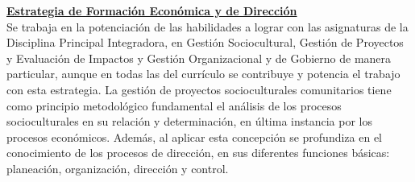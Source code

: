 \underline{\textbf{Estrategia de Formación Económica y de Dirección}}\\
Se trabaja en la potenciación de las habilidades a lograr con las asignaturas de la Disciplina Principal Integradora, en Gestión Sociocultural, Gestión de Proyectos y Evaluación de Impactos y Gestión Organizacional y de Gobierno de manera particular, aunque en todas las del currículo se contribuye y potencia el trabajo con esta estrategia. La gestión de proyectos socioculturales comunitarios tiene como principio metodológico fundamental el análisis de los procesos socioculturales en su relación y determinación, en última instancia por los procesos económicos. Además, al aplicar esta concepción se profundiza en el conocimiento de los procesos de dirección, en sus diferentes funciones básicas: planeación, organización, dirección y control.

